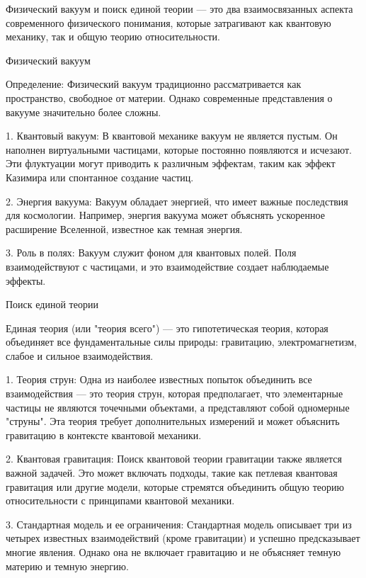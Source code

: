 \documentclass[exam_answers.tex]{subfiles}
\begin{document}
\renewcommand{\baselinestretch}{\blch}

Физический вакуум и поиск единой теории — это два взаимосвязанных аспекта современного физического понимания, которые затрагивают как квантовую механику, так и общую теорию относительности.

Физический вакуум

Определение: Физический вакуум традиционно рассматривается как пространство, свободное от материи. Однако современные представления о вакууме значительно более сложны.

1. Квантовый вакуум: В квантовой механике вакуум не является пустым. Он наполнен виртуальными частицами, которые постоянно появляются и исчезают. Эти флуктуации могут приводить к различным эффектам, таким как эффект Казимира или спонтанное создание частиц.

2. Энергия вакуума: Вакуум обладает энергией, что имеет важные последствия для космологии. Например, энергия вакуума может объяснять ускоренное расширение Вселенной, известное как темная энергия.

3. Роль в полях: Вакуум служит фоном для квантовых полей. Поля взаимодействуют с частицами, и это взаимодействие создает наблюдаемые эффекты.

Поиск единой теории

Единая теория (или "теория всего") — это гипотетическая теория, которая объединяет все фундаментальные силы природы: гравитацию, электромагнетизм, слабое и сильное взаимодействия.

1. Теория струн: Одна из наиболее известных попыток объединить все взаимодействия — это теория струн, которая предполагает, что элементарные частицы не являются точечными объектами, а представляют собой одномерные "струны". Эта теория требует дополнительных измерений и может объяснить гравитацию в контексте квантовой механики.

2. Квантовая гравитация: Поиск квантовой теории гравитации также является важной задачей. Это может включать подходы, такие как петлевая квантовая гравитация или другие модели, которые стремятся объединить общую теорию относительности с принципами квантовой механики.

3. Стандартная модель и ее ограничения: Стандартная модель описывает три из четырех известных взаимодействий (кроме гравитации) и успешно предсказывает многие явления. Однако она не включает гравитацию и не объясняет темную материю и темную энергию.
\end{document}
